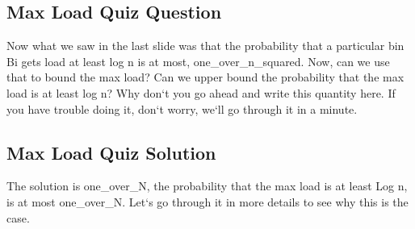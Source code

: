 \subsection{Max Load Quiz Question}
Now what we saw in the last slide was that the probability that a particular bin Bi gets load at least log n is at most, one\_over\_n\_squared.
Now, can we use that to bound the max load? Can we upper bound the probability that the max load is at least log n? Why don`t you go ahead and write this quantity here.
If you have trouble doing it, don`t worry, we`ll go through it in a minute.

\subsection{Max Load Quiz Solution}
The solution is one\_over\_N, the probability that the max load is at least Log n, is at most one\_over\_N\@.
Let`s go through it in more details to see why this is the case.

